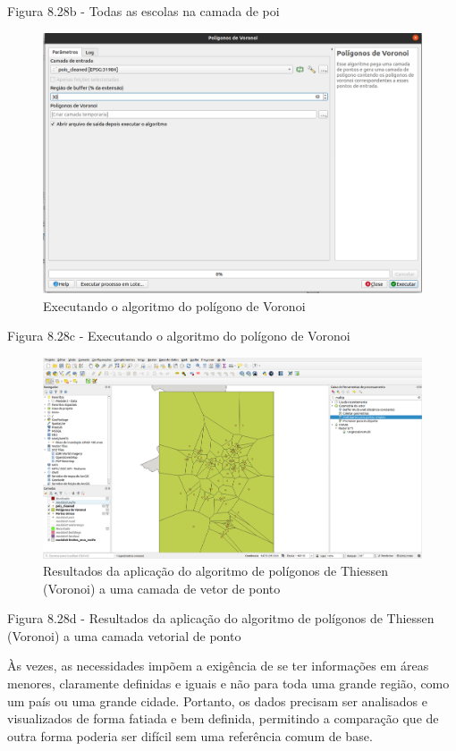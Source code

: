 \documentclass[
  portuguese,
]{krantz}
\begin{document}
Figura 8.28b - Todas as escolas na camada de poi

\begin{figure}
\centering
\includegraphics{media/modulo8/fig828_c.png}
\caption{Executando o algoritmo do polígono de Voronoi}
\end{figure}

Figura 8.28c - Executando o algoritmo do polígono de Voronoi

\begin{figure}
\centering
\includegraphics{media/modulo8/fig828_d.png}
\caption{Resultados da aplicação do algoritmo de polígonos de Thiessen (Voronoi) a uma camada de vetor de ponto}
\end{figure}

Figura 8.28d - Resultados da aplicação do algoritmo de polígonos de Thiessen (Voronoi) a uma camada vetorial de ponto

Às vezes, as necessidades impõem a exigência de se ter informações em áreas menores, claramente definidas e iguais e não para toda uma grande região, como um país ou uma grande cidade. Portanto, os dados precisam ser analisados \hspace{0pt}\hspace{0pt}e visualizados de forma fatiada e bem definida, permitindo a comparação que de outra forma poderia ser difícil sem uma referência comum de base.
\end{document}
